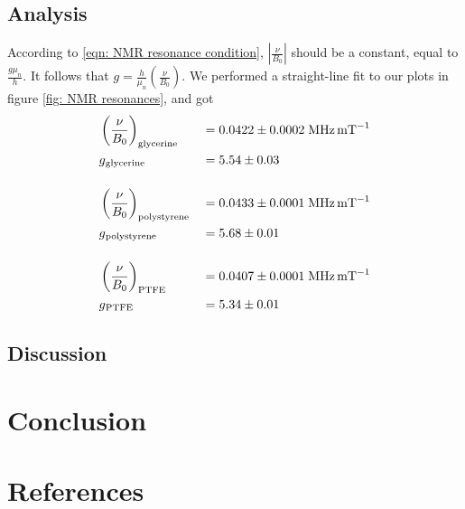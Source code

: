 \documentclass[a4paper]{jpconf}
\numberwithin{equation}{section}
\begin{document}
\subsection{Analysis}
According to \eqref{eqn: NMR resonance condition}, $\left| \frac{\nu}{B_0} \right|$ should be a constant, equal to $\frac{g \mu_n}{h}$. It follows that $g = \frac{h}{\mu_n} \left( \frac{\nu}{B_0} \right)$. We performed a straight-line fit to our plots in figure \ref{fig: NMR resonances}, and got
\begin{alignat*}{2}
    &\left( \frac{\nu}{B_0} \right)_{\text{glycerine}} &&= 0.0422 \pm 0.0002 \; \si{\mega\hertz\per\milli\tesla} \\
	&g\textsubscript{glycerine} &&= 5.54 \pm 0.03 \\[12pt]
	&\left( \frac{\nu}{B_0} \right)_{\text{polystyrene}} &&= 0.0433 \pm 0.0001 \; \si{\mega\hertz\per\milli\tesla} \\
	&g\textsubscript{polystyrene} &&= 5.68 \pm 0.01 \\[12pt]
	&\left( \frac{\nu}{B_0} \right)_{\text{PTFE}} &&= 0.0407 \pm 0.0001 \; \si{\mega\hertz\per\milli\tesla} \\
	&g\textsubscript{PTFE} &&= 5.34 \pm 0.01 \\
\end{alignat*}

\subsection{Discussion}

\section{Conclusion}

\section*{References}
\begin{thebibliography}{9}
\end{thebibliography}
\end{document}
